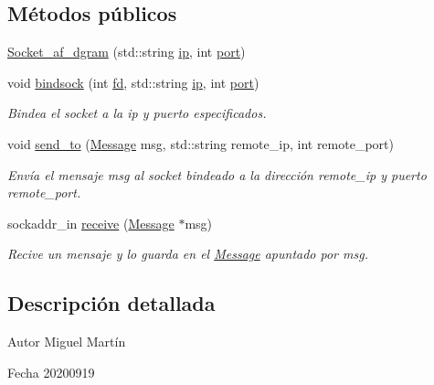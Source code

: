 \subsection*{Métodos públicos}
\begin{DoxyCompactItemize}
\item 
\hyperlink{classSocket__af__dgram_a11391f68bb56dafa6be879f388e4b0cd}{Socket\+\_\+af\+\_\+dgram} (std\+::string \hyperlink{classSocket__base_aed490170422026c6dfe5def12031cd04}{ip}, int \hyperlink{classSocket__base_afcdd7ae81a9fb867d012b7db8c259576}{port})
\item 
void \hyperlink{classSocket__af__dgram_a6a2084d50ab117b0bf6b699aa0573db5}{bindsock} (int \hyperlink{classSocket__base_a740aedbac3269e4981732dd6842cd9c2}{fd}, std\+::string \hyperlink{classSocket__base_aed490170422026c6dfe5def12031cd04}{ip}, int \hyperlink{classSocket__base_afcdd7ae81a9fb867d012b7db8c259576}{port})
\begin{DoxyCompactList}\small\item\em Bindea el socket a la ip y puerto especificados. \end{DoxyCompactList}\item 
void \hyperlink{classSocket__af__dgram_a744bb661eeebe5b5cdfca0028da6bd88}{send\+\_\+to} (\hyperlink{structMessage}{Message} msg, std\+::string remote\+\_\+ip, int remote\+\_\+port)
\begin{DoxyCompactList}\small\item\em Envía el mensaje {\itshape msg} al socket bindeado a la dirección {\itshape remote\+\_\+ip} y puerto {\itshape remote\+\_\+port}. \end{DoxyCompactList}\item 
sockaddr\+\_\+in \hyperlink{classSocket__af__dgram_a572c1e9c58c11512fa75d0ad7a775857}{receive} (\hyperlink{structMessage}{Message} $\ast$msg)
\begin{DoxyCompactList}\small\item\em Recive un mensaje y lo guarda en el \hyperlink{structMessage}{Message} apuntado por {\itshape msg}. \end{DoxyCompactList}\end{DoxyCompactItemize}


\subsection{Descripción detallada}
\begin{DoxyAuthor}{Autor}
Miguel Martín 
\end{DoxyAuthor}
\begin{DoxyDate}{Fecha}
20200919 
\end{DoxyDate}


